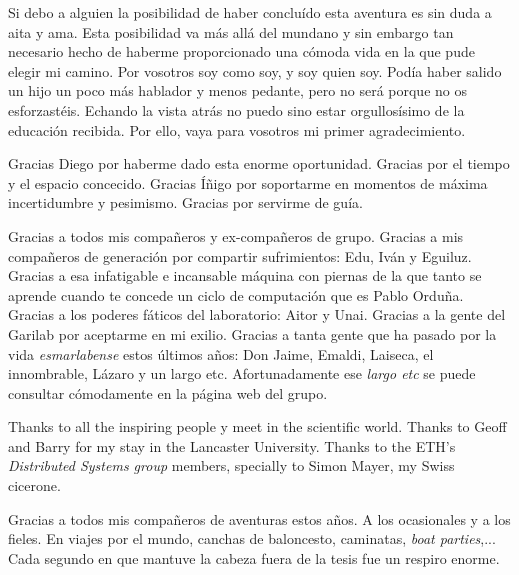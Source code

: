 


\begin{acknowledgements}      

Si debo a alguien la posibilidad de haber concluído esta aventura es sin duda a aita y ama.
Esta posibilidad va más allá del mundano y sin embargo tan necesario hecho de haberme proporcionado una cómoda vida en la que pude elegir mi camino.
Por vosotros soy como soy, y soy quien soy.
Podía haber salido un hijo un poco más hablador y menos pedante, pero no será porque no os esforzastéis.
Echando la vista atrás no puedo sino estar orgullosísimo de la educación recibida.
Por ello, vaya para vosotros mi primer agradecimiento.


Gracias Diego por haberme dado esta enorme oportunidad.
Gracias por el tiempo y el espacio concecido.
Gracias Íñigo por soportarme en momentos de máxima incertidumbre y pesimismo.
Gracias por servirme de guía.


Gracias a todos mis compañeros y ex-compañeros de grupo.
Gracias a mis compañeros de generación por compartir sufrimientos: Edu, Iván y Eguiluz.
Gracias a esa infatigable e incansable máquina con piernas de la que tanto se aprende cuando te concede un ciclo de computación que es Pablo Orduña.
Gracias a los poderes fáticos del laboratorio: Aitor y Unai.
Gracias a la gente del Garilab por aceptarme en mi exilio.
Gracias a tanta gente que ha pasado por la vida \emph{esmarlabense} estos últimos años: Don Jaime, Emaldi, Laiseca, el innombrable, Lázaro y un largo etc.
Afortunadamente ese \emph{largo etc} se puede consultar cómodamente en la página web del grupo.


Thanks to all the inspiring people y meet in the scientific world.
Thanks to Geoff and Barry for my stay in the Lancaster University.
Thanks to the ETH's \emph{Distributed Systems group} members, specially to Simon Mayer, my Swiss cicerone. %


Gracias a todos mis compañeros de aventuras estos años.
A los ocasionales y a los fieles.
En viajes por el mundo, canchas de baloncesto, caminatas, \emph{boat parties},...
Cada segundo en que mantuve la cabeza fuera de la tesis fue un respiro enorme.



\end{acknowledgements}
